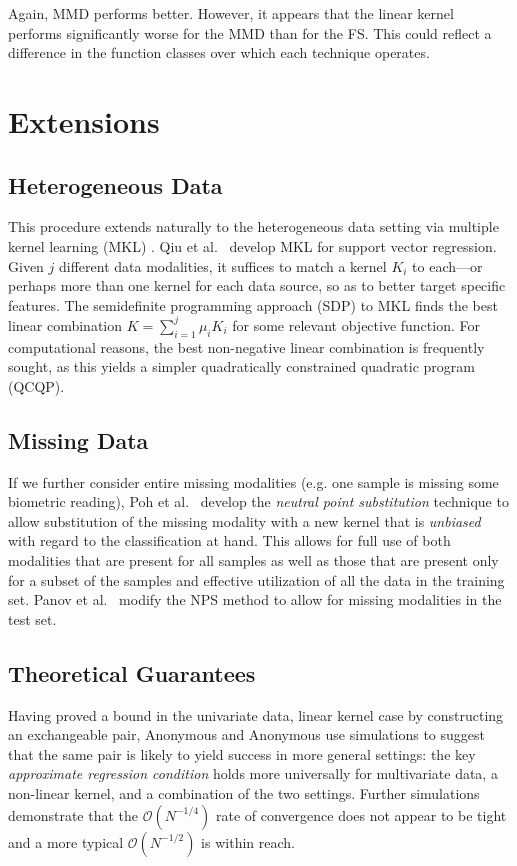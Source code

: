 Again, MMD performs better.  However, it appears that the linear
kernel performs significantly worse for the MMD than for the FS.
This could reflect a difference in the function classes over which
each technique operates.  

\section{Extensions}
\subsection{Heterogeneous Data}
This procedure extends naturally to the heterogeneous data setting via
multiple kernel learning (MKL) \cite{lanckriet2004learning,
  gonen2011multiple}.  Qiu et al.\ \cite{qiu2005multiple} develop MKL
for support vector regression.  Given $j$ different data modalities,
it suffices to match a kernel $K_i$ to each---or perhaps more than one
kernel for each data source, so as to better target specific features.
The semidefinite programming approach (SDP) to MKL finds the best
linear combination $K = \sum_{i=1}^j \mu_i K_i$ for some relevant
objective function.  For computational reasons, the best non-negative
linear combination is frequently sought, as this yields a simpler quadratically
constrained quadratic program (QCQP).

\subsection{Missing Data}
If we further consider entire missing modalities (e.g. one sample is
missing some biometric reading), Poh et al.\ \cite{poh2010addressing}
develop the \emph{neutral point substitution} technique to allow
substitution of the missing modality with a new kernel that is
\emph{unbiased} with regard to the classification at hand.  This
allows for full use of both modalities that are present for all
samples as well as those that are present only for a subset of the
samples and effective utilization of all the data in the training set.
Panov et al.\ \cite{panov2011modified} modify the NPS method to allow
for missing modalities in the test set.

\subsection{Theoretical Guarantees}
Having proved a bound in the univariate data, linear kernel case by
constructing an exchangeable pair, Anonymous and Anonymous
\cite{rayholmes2012} use simulations to suggest
that the same pair is likely to yield success in more general
settings: the key \emph{approximate regression condition} holds more
universally for multivariate data, a non-linear kernel, and a
combination of the two settings.  Further simulations demonstrate that
the $\mathcal{O}(N^{-1/4})$ rate of convergence does not appear to be
tight and a more typical $\mathcal{O}(N^{-1/2})$ is within reach.  

